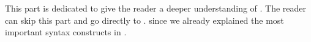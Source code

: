 This part is dedicated to give the reader a deeper understanding of \oz{}. The reader can skip this part and go directly to . since we already explained the most important syntax constructs in .